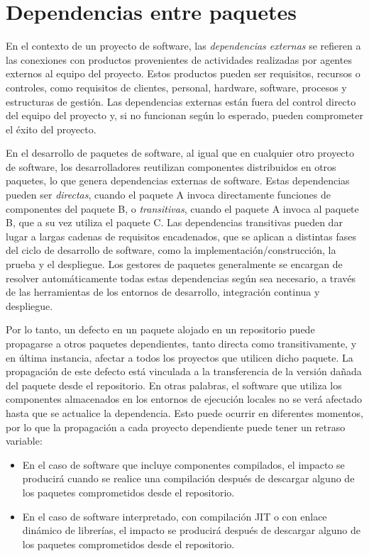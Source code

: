 \section{Dependencias entre paquetes}

En el contexto de un proyecto de software, las \textit{dependencias externas} se refieren a las
conexiones con productos provenientes de actividades realizadas por agentes externos al equipo
del proyecto. Estos productos pueden ser requisitos, recursos o controles, como requisitos de clientes,
personal, hardware, software, procesos y estructuras de gestión.
Las dependencias externas están fuera del control directo del equipo del proyecto y, si no funcionan
según lo esperado, pueden comprometer el éxito del proyecto.

En el desarrollo de paquetes de software, al igual que en cualquier otro proyecto de software,
los desarrolladores reutilizan componentes distribuidos en otros paquetes, lo que genera dependencias
externas de software. Estas dependencias pueden ser \textit{directas}, cuando el paquete A invoca
directamente funciones de componentes del paquete B, o \textit{transitivas}, cuando el paquete A
invoca al paquete B, que a su vez utiliza el paquete C.
Las dependencias transitivas pueden dar lugar a largas cadenas de requisitos encadenados, que se
aplican a distintas fases del ciclo de desarrollo de software, como la implementación/construcción,
la prueba y el despliegue. Los gestores de paquetes generalmente se encargan de resolver automáticamente
todas estas dependencias según sea necesario, a través de las herramientas de los entornos de desarrollo,
integración continua y despliegue.

Por lo tanto, un defecto en un paquete alojado en un repositorio puede propagarse a otros paquetes
dependientes, tanto directa como transitivamente, y en última instancia, afectar a todos los proyectos
que utilicen dicho paquete. La propagación de este defecto está vinculada a la transferencia de la
versión dañada del paquete desde el repositorio. En otras palabras, el software que utiliza los
componentes almacenados en los entornos de ejecución locales no se verá afectado hasta que se
actualice la dependencia. Esto puede ocurrir en diferentes momentos, por lo que la propagación
a cada proyecto dependiente puede tener un retraso variable:

\begin{itemize}
    \item En el caso de software que incluye componentes compilados, el impacto se producirá cuando
          se realice una compilación después de descargar alguno de los paquetes comprometidos desde el
          repositorio.
    \item En el caso de software interpretado, con compilación JIT o con enlace dinámico de librerías,
          el impacto se producirá después de descargar alguno de los paquetes comprometidos desde el
          repositorio.
\end{itemize}

